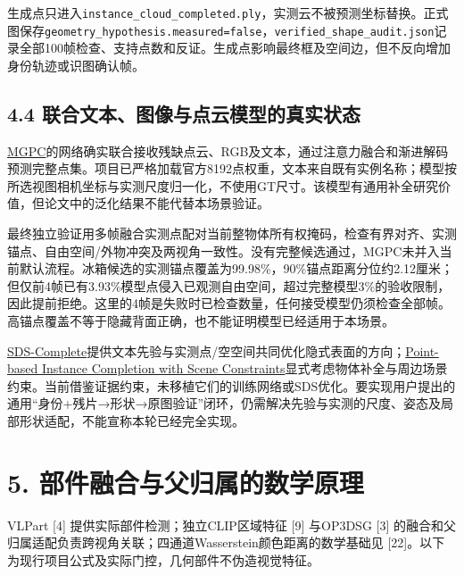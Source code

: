 \documentclass[UTF8,fontset=fandol]{ctexart}
\begin{document}
生成点只进入\texttt{instance\_\allowbreak{}cloud\_\allowbreak{}completed.\allowbreak{}ply}，实测云不被预测坐标替换。正式图保存\texttt{geometry\_\allowbreak{}hypothesis.\allowbreak{}measured=false}，\texttt{verified\_\allowbreak{}shape\_\allowbreak{}audit.\allowbreak{}json}记录全部100帧检查、支持点数和反证。生成点影响最终框及空间边，但不反向增加身份轨迹或识图确认帧。



\subsection*{4.4 联合文本、图像与点云模型的真实状态}

\href{https://arxiv.org/html/2601.03660v2}{MGPC}的网络确实联合接收残缺点云、RGB及文本，通过注意力融合和渐进解码预测完整点集。项目已严格加载官方8192点权重，文本来自既有实例名称；模型按所选视图相机坐标与实测尺度归一化，不使用GT尺寸。该模型有通用补全研究价值，但论文中的泛化结果不能代替本场景验证。



最终独立验证用多帧融合实测点配对当前整物体所有权掩码，检查有界对齐、实测锚点、自由空间/外物冲突及两视角一致性。没有完整候选通过，MGPC未并入当前默认流程。冰箱候选的实测锚点覆盖为99.98\%，90\%锚点距离分位约2.12厘米；但仅前4帧已有3.93\%模型点侵入已观测自由空间，超过完整模型3\%的验收限制，因此提前拒绝。这里的4帧是失败时已检查数量，任何接受模型仍须检查全部帧。高锚点覆盖不等于隐藏背面正确，也不能证明模型已经适用于本场景。



\href{https://sds-complete.github.io/}{SDS-Complete}提供文本先验与实测点/空空间共同优化隐式表面的方向；\href{https://arxiv.org/html/2504.05698v1}{Point-based Instance Completion with Scene Constraints}显式考虑物体补全与周边场景约束。当前借鉴证据约束，未移植它们的训练网络或SDS优化。要实现用户提出的通用“身份+残片→形状→原图验证”闭环，仍需解决先验与实测的尺度、姿态及局部形状适配，不能宣称本轮已经完全实现。



\section*{5. 部件融合与父归属的数学原理}

VLPart [4] 提供实际部件检测；独立CLIP区域特征 [9] 与OP3DSG [3] 的融合和父归属适配负责跨视角关联；四通道Wasserstein颜色距离的数学基础见 [22]。以下为现行项目公式及实际门控，几何部件不伪造视觉特征。
\end{document}
